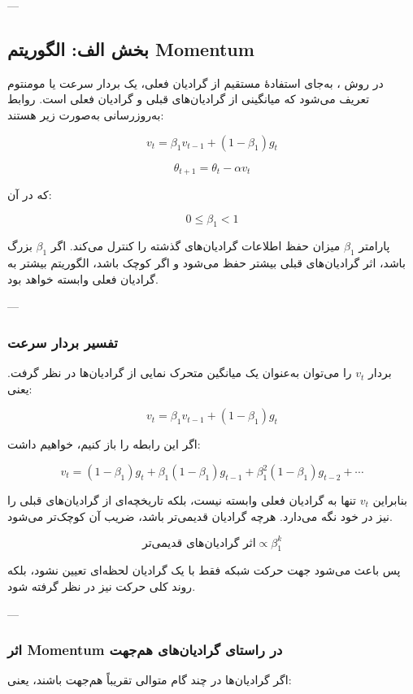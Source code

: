 \documentclass[12pt,a4paper]{article}
\begin{document}
---

\subsection{بخش الف: الگوریتم Momentum}

در روش ، به‌جای استفادهٔ مستقیم از گرادیان فعلی، یک بردار سرعت یا مومنتوم تعریف می‌شود که میانگینی از گرادیان‌های قبلی و گرادیان فعلی است. روابط به‌روزرسانی به‌صورت زیر هستند:

\[
v_t = \beta_1 v_{t-1} + (1-\beta_1)g_t
\]

\[
\theta_{t+1} = \theta_t - \alpha v_t
\]

که در آن:

\[
0 \leq \beta_1 < 1
\]

پارامتر \(\beta_1\) میزان حفظ اطلاعات گرادیان‌های گذشته را کنترل می‌کند. اگر \(\beta_1\) بزرگ باشد، اثر گرادیان‌های قبلی بیشتر حفظ می‌شود و اگر کوچک باشد، الگوریتم بیشتر به گرادیان فعلی وابسته خواهد بود.

---

\subsubsection{تفسیر بردار سرعت}

بردار \(v_t\) را می‌توان به‌عنوان یک میانگین متحرک نمایی از گرادیان‌ها در نظر گرفت. یعنی:

\[
v_t = \beta_1 v_{t-1} + (1-\beta_1)g_t
\]

اگر این رابطه را باز کنیم، خواهیم داشت:

\[
v_t = (1-\beta_1)g_t + \beta_1(1-\beta_1)g_{t-1}
+ \beta_1^2(1-\beta_1)g_{t-2}+\cdots
\]

بنابراین \(v_t\) تنها به گرادیان فعلی وابسته نیست، بلکه تاریخچه‌ای از گرادیان‌های قبلی را نیز در خود نگه می‌دارد. هرچه گرادیان قدیمی‌تر باشد، ضریب آن کوچک‌تر می‌شود.

\[
\text{اثر گرادیان‌های قدیمی‌تر} \propto \beta_1^k
\]

پس  باعث می‌شود جهت حرکت شبکه فقط با یک گرادیان لحظه‌ای تعیین نشود، بلکه روند کلی حرکت نیز در نظر گرفته شود.

---

\subsubsection{اثر Momentum در راستای گرادیان‌های هم‌جهت}

اگر گرادیان‌ها در چند گام متوالی تقریباً هم‌جهت باشند، یعنی:
\end{document}
